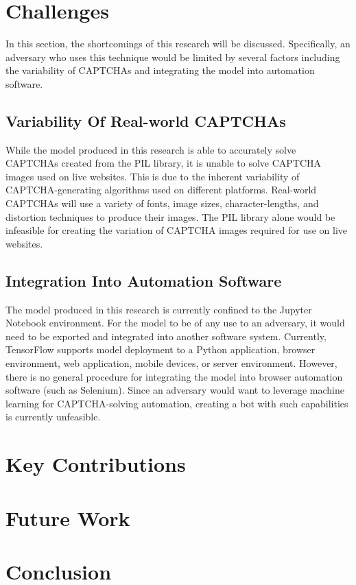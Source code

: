 \documentclass[11pt,conference]{IEEEtran}
\begin{document}
\section{Challenges}
In this section, the shortcomings of this research will be discussed.
Specifically, an adversary who uses this technique would be limited by several
factors including the variability of CAPTCHAs and integrating the model into automation software.

\subsection{Variability Of Real-world CAPTCHAs}
While the model produced in this research is able to accurately solve CAPTCHAs created
from the PIL library, it is unable to solve CAPTCHA images
used on live websites. This is due to the inherent variability of
CAPTCHA-generating algorithms used on different platforms. Real-world CAPTCHAs
will use a variety of fonts, image sizes, character-lengths, and distortion
techniques to produce their images. The PIL library alone would be infeasible
for creating the variation of CAPTCHA images required for use on live websites.

\subsection{Integration Into Automation Software}
The model produced in this research is currently confined to the Jupyter
Notebook environment. For the model to be of any use to an adversary, it would
need to be exported and integrated into another software system. Currently,
TensorFlow supports model deployment to a Python application,
browser environment, web application, mobile devices, or server environment.
However, there is no general procedure for integrating the model into
browser automation software (such as Selenium). Since an adversary would want
to leverage machine learning for CAPTCHA-solving automation, creating a bot
with such capabilities is currently unfeasible.

\section{Key Contributions}

\section{Future Work}

\section{Conclusion}
\end{document}
